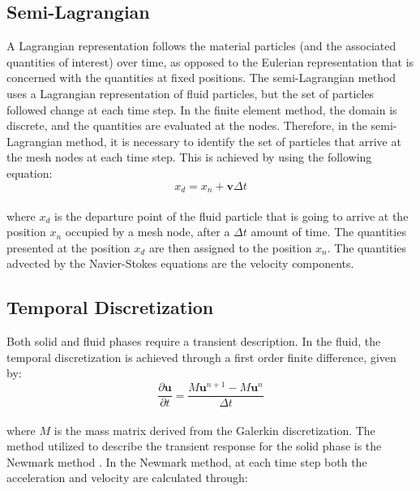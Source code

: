 \documentclass{article}
\begin{document}
\subsection{Semi-Lagrangian}

A Lagrangian representation follows the material particles (and the associated quantities of interest) over time, as opposed to the Eulerian representation that is concerned with the quantities at fixed positions. The semi-Lagrangian method uses a Lagrangian representation of fluid particles, but the set of particles followed change at each time step. In the finite element method, the domain is discrete, and the quantities are evaluated at the nodes. Therefore, in the semi-Lagrangian method, it is necessary to identify the set of particles that arrive at the mesh nodes at each time step. This is achieved by using the following equation: \\

\begin{equation}
	x_d = x_n + \mathbf{v} \Delta t
\end{equation} \\

\noindent where $x_d$ is the departure point of the fluid particle that is going to arrive at the position $x_n$ occupied by a mesh node, after a $\Delta t$ amount of time. The quantities presented at the position $x_d$ are then assigned to the position $x_n$. The quantities advected by the Navier-Stokes equations are the velocity components.

\subsection{Temporal Discretization}

Both solid and fluid phases require a transient description. In the fluid, the temporal discretization is achieved through a first order finite difference, given by: \\

\begin{equation}
	\frac{\partial \mathbf{u}}{ \partial t} = \frac{M\mathbf{u}^{n+1} - M\mathbf{u}^{n}}{\Delta t}
\end{equation} \\

\noindent where $M$ is the mass matrix derived from the Galerkin discretization. The method utilized to describe the transient response for the solid phase is the Newmark method \cite{newmark1959}. In the Newmark method, at each time step both the acceleration and velocity are calculated through: \\
\end{document}
